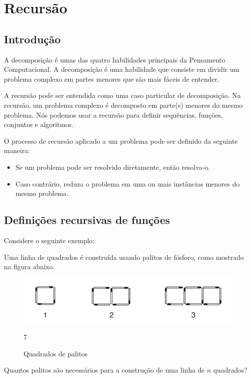 \chapter[Recursão]{Recursão}

\section{Introdução}\label{sec1.1}


A decomposição é umas das quatro habilidades principais da Pensamento Computacional. A decomposição é uma habilidade que consiste em dividir um problema complexo em partes menores que são mais fáceis de entender. 

A recursão pode ser entendida como uma caso particular de decomposição. Na recursão, um problema complexo é decomposto em parte(s) menores do mesmo problema. Nós podemos usar a recursão para definir sequências, funções, conjuntos e algoritmos.  

O processo de recursão aplicado a um problema pode ser definido da seguinte maneira:

\begin{itemize}
    \item Se um problema pode ser resolvido diretamente, então resolva-o.
    \item Caso contrário, reduza o problema em uma ou mais instâncias menores do mesmo problema.
\end{itemize}



\section{Definições recursivas de funções}\label{sec1.2}

Considere o seguinte exemplo: 

\begin{exemplo}
Uma linha de quadrados é construída usando palitos de fósforo, como mostrado na figura abaixo.


\begin{figure}[htbp]
\centering
\includegraphics[width=.9\textwidth]{images/fosforos.png}
\label{fig::palitos}
\caption{Quadrados de palitos} 
7

\end{figure}

Quantos palitos são necessários para a construção de uma linha de $n$ quadrados? 

\end{exemplo}

